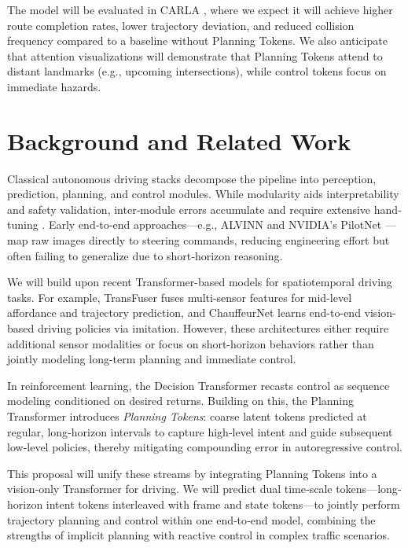 \documentclass[11pt,a4paper]{article}
\begin{document}
The model will be evaluated in CARLA \cite{DBLP:journals/corr/abs-1711-03938}, where we expect it will achieve higher route completion rates, lower trajectory deviation, and reduced collision frequency compared to a baseline without Planning Tokens. We also anticipate that attention visualizations will demonstrate that Planning Tokens attend to distant landmarks (e.g., upcoming intersections), while control tokens focus on immediate hazards.

\section*{Background and Related Work}
Classical autonomous driving stacks decompose the pipeline into perception, prediction, planning, and control modules. While modularity aids interpretability and safety validation, inter‐module errors accumulate and require extensive hand‐tuning \cite{DBLP:journals/corr/PadenCYYF16,SchwartingWilko2018PaDf}. Early end‐to‐end approaches—e.g., ALVINN \cite{NIPS1988_812b4ba2} and NVIDIA’s PilotNet \cite{DBLP:journals/corr/BojarskiTDFFGJM16}—map raw images directly to steering commands, reducing engineering effort but often failing to generalize due to short‐horizon reasoning.

We will build upon recent Transformer-based models for spatiotemporal driving tasks. For example, TransFuser \cite{chitta2022transfuserimitationtransformerbasedsensor} fuses multi-sensor features for mid-level affordance and trajectory prediction, and ChauffeurNet \cite{DBLP:journals/corr/abs-1812-03079} learns end-to-end vision-based driving policies via imitation. However, these architectures either require additional sensor modalities or focus on short-horizon behaviors rather than jointly modeling long-term planning and immediate control.

In reinforcement learning, the Decision Transformer \cite{DBLP:journals/corr/abs-2106-01345} recasts control as sequence modeling conditioned on desired returns. Building on this, the Planning Transformer \cite{clinton2024planningtransformerlonghorizonoffline} introduces \emph{Planning Tokens}: coarse latent tokens predicted at regular, long‐horizon intervals to capture high‐level intent and guide subsequent low‐level policies, thereby mitigating compounding error in autoregressive control.

This proposal will unify these streams by integrating Planning Tokens into a vision‐only Transformer for driving. We will predict dual time‐scale tokens—long‐horizon intent tokens interleaved with frame and state tokens—to jointly perform trajectory planning and control within one end‐to‐end model, combining the strengths of implicit planning with reactive control in complex traffic scenarios.
\end{document}
